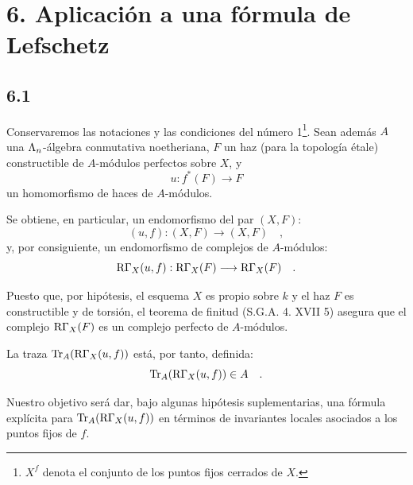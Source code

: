 \section*{6. Aplicación a una fórmula de Lefschetz}

\subsection*{6.1}
Conservaremos las notaciones y las condiciones del número 1\footnote{$X^f$ denota el conjunto de los puntos fijos cerrados de $X$.}. Sean además $A$ una $\Lambda_n$-álgebra conmutativa noetheriana, $F$ un haz (para la topología étale) constructible de $A$-módulos perfectos sobre $X$, y
\[
u : f^*(F) \longrightarrow F
\]
un homomorfismo de haces de $A$-módulos.

Se obtiene, en particular, un endomorfismo del par $(X, F)$:
\[
(u, f) : (X, F) \longrightarrow (X, F) \quad ,
\]
y, por consiguiente, un endomorfismo de complejos de $A$-módulos:
\[
\mathrm{R}\Gamma_X(u, f) : \mathrm{R}\Gamma_X(F) \longrightarrow \mathrm{R}\Gamma_X(F) \quad .
\]

Puesto que, por hipótesis, el esquema $X$ es propio sobre $k$ y el haz $F$ es constructible y de torsión, el teorema de finitud (S.G.A. 4. XVII 5) asegura que el complejo $\mathrm{R}\Gamma_X(F)$ es un complejo perfecto de $A$-módulos.

La traza $\operatorname{Tr}_A(\mathrm{R}\Gamma_X(u, f))$ está, por tanto, definida:
\[
\operatorname{Tr}_A(\mathrm{R}\Gamma_X(u, f)) \in A \quad .
\]

Nuestro objetivo será dar, bajo algunas hipótesis suplementarias, una fórmula explícita para $\operatorname{Tr}_A(\mathrm{R}\Gamma_X(u, f))$ en términos de invariantes locales asociados a los puntos fijos de $f$.
